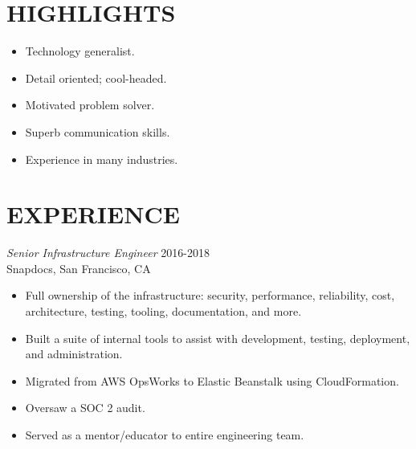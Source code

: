 \documentclass[line,margin]{res}
\begin{document}
\address{\,\,\,\,\,\,\,\,\,\,\,\,\,\,\,\,\,\,\,\,\, dana.merrick@gmail.com}
\address{\,\,\,\,\,\,\,\,\,\,\,\,\,\,\,\,\,\,\,\,USA-based -- 978.206.1331}

\begin{resume}

\section{HIGHLIGHTS}
  \begin{itemize}  \itemsep -2pt %
    \item Technology generalist.
    \item Detail oriented; cool-headed.
    \item Motivated problem solver.
    \item Superb communication skills.
    \item Experience in many industries.
  \end{itemize}
  
\section{EXPERIENCE}
  {\sl Senior Infrastructure Engineer}  \hfill 2016-2018 \\
  Snapdocs,
  San Francisco, CA
  \begin{itemize}  \itemsep -2pt %
    \item Full ownership of the infrastructure: security, performance, reliability, cost, architecture, testing, tooling, documentation, and more.
    \item Built a suite of internal tools to assist with development, testing, deployment, and administration.
    \item Migrated from AWS OpsWorks to Elastic Beanstalk using CloudFormation.
    \item Oversaw a SOC 2 audit.
    \item Served as a mentor/educator to entire engineering team.
  \end{itemize}


\end{resume}
\end{document}
